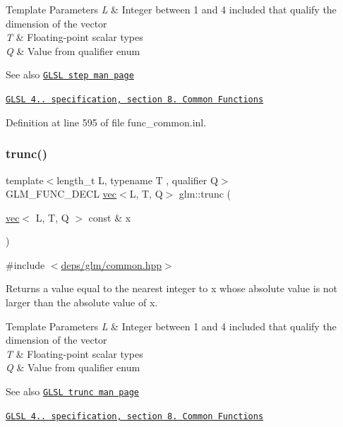 \begin{DoxyTemplParams}{Template Parameters}
{\em L} & Integer between 1 and 4 included that qualify the dimension of the vector \\
\hline
{\em T} & Floating-\/point scalar types \\
\hline
{\em Q} & Value from qualifier enum\\
\hline
\end{DoxyTemplParams}
\begin{DoxySeeAlso}{See also}
\href{http://www.opengl.org/sdk/docs/manglsl/xhtml/step.xml}{\tt G\+L\+SL step man page} 

\href{http://www.opengl.org/registry/doc/GLSLangSpec.4.20.8.pdf}{\tt G\+L\+SL 4.. specification, section 8. Common Functions} 
\end{DoxySeeAlso}


Definition at line 595 of file func\+\_\+common.\+inl.

\mbox{\label{group__core__func__common_gaf9375e3e06173271d49e6ffa3a334259}} 
\subsubsection{\texorpdfstring{trunc()}{trunc()}}
{\footnotesize\ttfamily template$<$length\+\_\+t L, typename T , qualifier Q$>$ \\
G\+L\+M\+\_\+\+F\+U\+N\+C\+\_\+\+D\+E\+CL \hyperlink{structglm_1_1vec}{vec}$<$L, T, Q$>$ glm\+::trunc (\begin{DoxyParamCaption}\item[{\hyperlink{structglm_1_1vec}{vec}$<$ L, T, Q $>$ const \&}]{x }\end{DoxyParamCaption})}



{\ttfamily \#include $<$\hyperlink{common_8hpp}{deps/glm/common.\+hpp}$>$}

Returns a value equal to the nearest integer to x whose absolute value is not larger than the absolute value of x.


\begin{DoxyTemplParams}{Template Parameters}
{\em L} & Integer between 1 and 4 included that qualify the dimension of the vector \\
\hline
{\em T} & Floating-\/point scalar types \\
\hline
{\em Q} & Value from qualifier enum\\
\hline
\end{DoxyTemplParams}
\begin{DoxySeeAlso}{See also}
\href{http://www.opengl.org/sdk/docs/manglsl/xhtml/trunc.xml}{\tt G\+L\+SL trunc man page} 

\href{http://www.opengl.org/registry/doc/GLSLangSpec.4.20.8.pdf}{\tt G\+L\+SL 4.. specification, section 8. Common Functions} 
\end{DoxySeeAlso}


